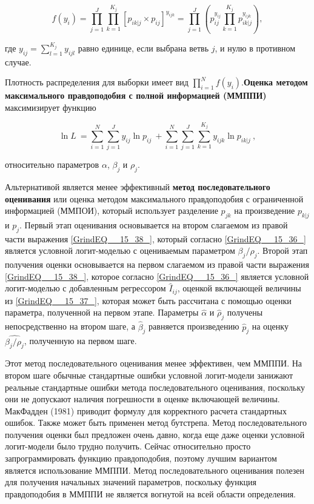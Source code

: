 \[f\left(y_i\right)=\prod^J_{j=1}{\prod^{K_j}_{k=1}{{\left[p_{ik|j}\times p_{ij}\right]}^{y_{ijk}}=\prod^J_{j=1}{\left(p^{y_{ij}}_{ij}\prod^{K_j}_{k = 1}{p^{y_{ijk}}_{ik|j}}\right)}},}\] 

где $y_{ij}=\sum^{K_j}_{l=1}{y_{ijl}}$ равно единице, если выбрана ветвь $j$, и нулю в противном случае.

Плотность распределения для выборки имеет вид $\prod^N_{i=1}{f\left(y_i\right).}$\textbf{Оценка методом максимального правдоподобия с полной информацией (ММППИ)} максимизирует функцию

\begin{equation} \label{GrindEQ__15_38_} {\ln  L\ }=\sum^N_{i=1}{\sum^J_{j=1}{y_{ij}{\ln  p_{ij}\ }}+\sum^N_{i=1}{\sum^J_{j=1}{\sum^{K_j}_{k=1}{y_{ijk}{\ln  p_{ik|j}\ }}}}}, \end{equation} 

относительно параметров $\alpha $, ${\beta }_j$ и ${\rho }_j.$

Альтернативой является менее эффективный \textbf{метод последовательного оценивания} или оценка методом максимального правдоподобия с ограниченной информацией (ММПОИ), который использует разделение $p_{jk}$ на произведение $p_{k|j}$ и $p_j$. Первый этап оценивания основывается на втором слагаемом из правой части выражения \eqref{GrindEQ__15_38_}, который согласно \eqref{GrindEQ__15_36_} является условной логит-моделью с оцениваемым параметром ${\beta }_j/{\rho }_j.$ Второй этап получения оценки основывается на первом слагаемом из правой части выражения \eqref{GrindEQ__15_38_}, которое согласно \eqref{GrindEQ__15_36_} является условной логит-моделью с добавленным регрессором ${\hat{I}}_{ij}$, оценкой включающей величины из \eqref{GrindEQ__15_37_}, которая может быть рассчитана с помощью оценки параметра, полученной на первом этапе. Параметры $\widehat{\alpha }$ и ${\widehat{\rho }}_j$ получены непосредственно на втором шаге, а ${\widehat{\beta }}_j$ равняется произведению ${\hat{p}}_j$ на оценку $\widehat{{\beta }_j/{\rho }_j}$, полученную на первом шаге.

Этот метод последовательного оценивания менее эффективен, чем ММППИ. На втором шаге обычные стандартные ошибки условной логит-модели занижают реальные стандартные ошибки метода последовательного оценивания, поскольку они не допускают наличия погрешности в оценке включающей величины. МакФадден (1981) приводит формулу для корректного расчета стандартных ошибок. Также может быть применен метод бутстрепа. Метод последовательного получения оценки был предложен очень давно, когда еще даже оценки условной логит-модели было трудно получить. Сейчас относительно просто запрограммировать функцию правдоподобия, поэтому лучшим вариантом является использование ММППИ. Метод последовательного оценивания полезен для получения начальных значений параметров, поскольку функция правдоподобия в ММППИ не является вогнутой на всей области определения.

